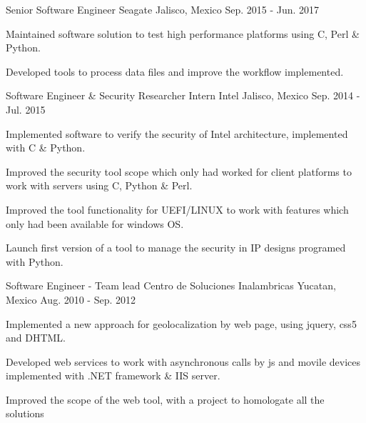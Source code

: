 


\begin{cventries}


\cventry
{Senior Software Engineer} %
{Seagate} %
{Jalisco, Mexico} %
{Sep. 2015 - Jun. 2017 } %
{ %
\begin{cvitems}
\item {Maintained software solution to test high performance platforms using C, Perl \& Python.}
\item {Developed tools to process data files and improve the workflow implemented.}
\end{cvitems}
}


\cventry
{Software Engineer \& Security Researcher Intern} %
{Intel} %
{Jalisco, Mexico} %
{Sep. 2014 -  Jul. 2015} %
{ %
\begin{cvitems}
\item {Implemented software to verify the security of Intel architecture, implemented with C \& Python.}
\item {Improved the security tool scope which only had worked for client platforms to work with servers using C, Python \& Perl.}
\item {Improved the tool functionality for UEFI/LINUX to work with features which only had been available for windows OS.}
\item {Launch first version of a tool to manage the security in IP designs programed with Python.}
\end{cvitems}
}


\cventry
{Software Engineer - Team lead } %
{Centro de Soluciones Inalambricas} %
{Yucatan, Mexico} %
{Aug. 2010 - Sep. 2012} %
{ %
\begin{cvitems}
\item {Implemented a new approach for geolocalization by web page, using jquery, css5 and DHTML.}
\item {Developed web services to work with asynchronous calls by js and movile devices implemented with .NET framework \& IIS server.}
\item {Improved the scope of the web tool, with a project to homologate all the solutions}
\end{cvitems} 
}


\end{cventries}
